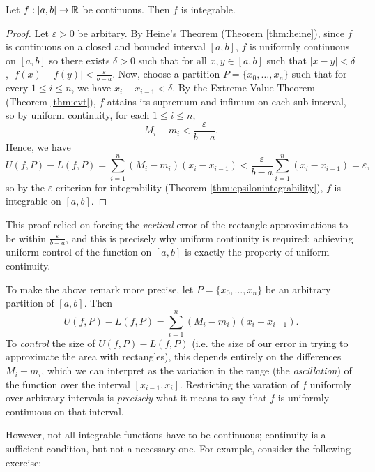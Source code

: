 \documentclass[../analysis1.tex]{subfiles}
\begin{document}
\begin{theorem}
\label{thm:contintegrable}
    \begin{shaded*}
        Let $f:[a,b]\to\mathbb{R}$ be continuous. Then $f$ is integrable.
    \end{shaded*}
\end{theorem}
\begin{proof}
    Let $\varepsilon>0$ be arbitary. By Heine's Theorem (Theorem \ref{thm:heine}), since $f$ is continuous on a closed and bounded interval $[a,b]$, $f$ is uniformly continuous on $[a,b]$ so there exists $\delta>0$ such that for all $x,y\in[a,b]$ such that $|x-y|<\delta$, $|f(x)-f(y)|<\frac{\varepsilon}{b-a}$. Now, choose a partition $P=\{x_0,\dots,x_n\}$ such that for every $1\le i\le n$, we have $x_i-x_{i - 1}<\delta$. By the Extreme Value Theorem (Theorem \ref{thm:evt}), $f$ attains its supremum and infimum on each sub-interval, so by uniform continuity, for each $1\le i\le n$,
    \[M_i-m_i<\frac{\varepsilon}{b-a}.\]
    Hence, we have
    \[U(f,P)-L(f,P)=\sum_{i=1}^n (M_i-m_i)(x_i-x_{i - 1})<\frac{\varepsilon}{b-a}\sum_{i=1}^n(x_i - x_{i - 1})=\varepsilon,\]
    so by the $\varepsilon$-criterion for integrability (Theorem \ref{thm:epsilonintegrability}), $f$ is integrable on $[a,b]$. \qedhere
\end{proof}

\begin{remark}
    This proof relied on forcing the \textit{vertical} error of the rectangle approximations to be within $\frac{\varepsilon}{b-a}$, and this is precisely why uniform continuity is required: achieving uniform control of the function on $[a,b]$ is exactly the property of uniform continuity.
\end{remark}

To make the above remark more precise, let $P=\{x_0,\dots,x_n\}$ be an arbitrary partition of $[a,b]$. Then
\[U(f,P)-L(f,P)=\sum_{i=1}^n (M_i-m_i)(x_i-x_{i - 1}).\]
To \textit{control} the size of $U(f,P)-L(f,P)$ (i.e. the size of our error in trying to approximate the area with rectangles), this depends entirely on the differences $M_i-m_i$, which we can interpret as the variation in the range (the \textit{oscillation}) of the function over the interval $[x_{i - 1},x_i]$. Restricting the varation of $f$ uniformly over arbitrary intervals is \textit{precisely} what it means to say that $f$ is uniformly continuous on that interval.

However, not all integrable functions have to be continuous; continuity is a sufficient condition, but not a necessary one. For example, consider the following exercise:
\end{document}
